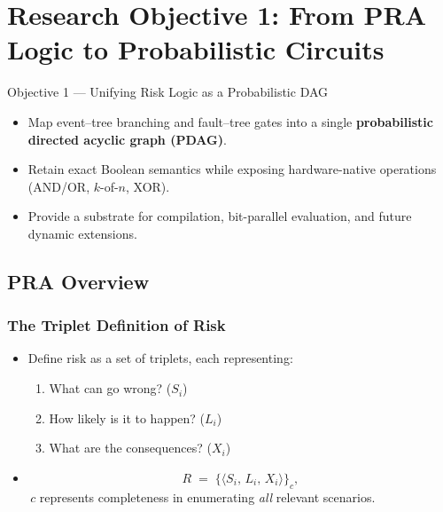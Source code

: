 \section{Research Objective 1: From PRA Logic to Probabilistic Circuits}
\begin{frame}{Objective 1 — Unifying Risk Logic as a Probabilistic DAG}
\begin{itemize}[<+->]
  \item Map event–tree branching and fault–tree gates into a single \textbf{probabilistic directed acyclic graph (PDAG)}.
  \item Retain exact Boolean semantics while exposing hardware-native operations (AND/OR, $k$-of-$n$, XOR).
  \item Provide a substrate for compilation, bit-parallel evaluation, and future dynamic extensions.
\end{itemize}
\end{frame}

\subsection{PRA Overview}
\begin{frame}[allowframebreaks]
\frametitle{The Triplet Definition of Risk}
\begin{itemize}
  \item Define risk as a set of triplets, each representing:
    \begin{enumerate}
      \item What can go wrong? (\(S_i\))
      \item How likely is it to happen? (\(L_i\))
      \item What are the consequences? (\(X_i\))
    \end{enumerate}
        \vspace{6pt}
  \item
    \begin{equation}
    \label{eq:risk_triplets_slides}
      R \;=\;\bigl\{\langle S_i,\,L_i,\,X_i\rangle\bigr\}_{c},
    \end{equation}
    \(\,c\) represents completeness in enumerating \emph{all} relevant scenarios.
\end{itemize}
\end{frame}

